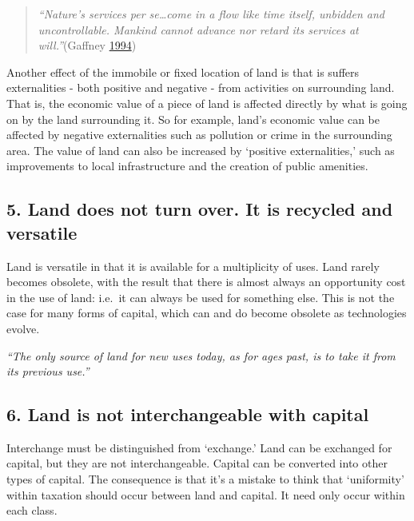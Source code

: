 \documentclass[]{tufte-handout}
\begin{document}
\begin{quote}
\emph{``Nature's services per se\ldots{}come in a flow like time itself,
unbidden and uncontrollable. Mankind cannot advance nor retard its
services at will.''}(Gaffney \protect\hyperlink{ref-Gaffney1994}{1994})
\end{quote}

Another effect of the immobile or fixed location of land is that is
suffers externalities - both positive and negative - from activities on
surrounding land. That is, the economic value of a piece of land is
affected directly by what is going on by the land surrounding it. So for
example, land's economic value can be affected by negative externalities
such as pollution or crime in the surrounding area. The value of land
can also be increased by `positive externalities,' such as improvements
to local infrastructure and the creation of public amenities.

\hypertarget{land-does-not-turn-over.-it-is-recycled-and-versatile}{%
\subsection{5. Land does not turn over. It is recycled and
versatile}\label{land-does-not-turn-over.-it-is-recycled-and-versatile}}

Land is versatile in that it is available for a multiplicity of uses.
Land rarely becomes obsolete, with the result that there is almost
always an opportunity cost in the use of land: i.e.~it can always be
used for something else. This is not the case for many forms of capital,
which can and do become obsolete as technologies evolve.

\emph{``The only source of land for new uses today, as for ages past, is
to take it from its previous use.''}

\hypertarget{land-is-not-interchangeable-with-capital}{%
\subsection{6. Land is not interchangeable with
capital}\label{land-is-not-interchangeable-with-capital}}

Interchange must be distinguished from `exchange.' Land can be exchanged
for capital, but they are not interchangeable. Capital can be converted
into other types of capital. The consequence is that it's a mistake to
think that `uniformity' within taxation should occur between land and
capital. It need only occur within each class.
\end{document}

